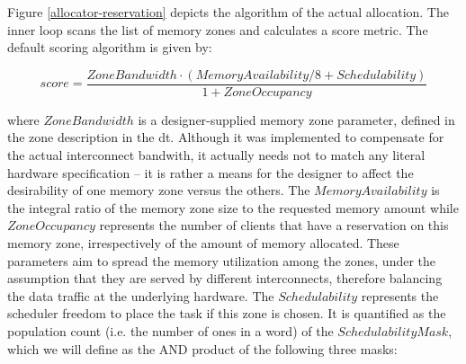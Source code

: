 Figure \ref{allocator-reservation} depicts the algorithm of the actual allocation. 
The inner loop scans the list of memory zones and calculates a score metric.
The default scoring algorithm is given by:

\[
	score = \frac{ZoneBandwidth \cdot \left(MemoryAvailability/8 + Schedulability\right)}{1 + ZoneOccupancy}
\]

where $ZoneBandwidth$ is a designer-supplied memory zone parameter, defined in the zone description in the \gls{dt}.
Although it was implemented to compensate for the actual interconnect bandwith,
it actually needs not to match any literal hardware specification -- it is rather a means for the designer to affect the
desirability of one memory zone versus the others. The $MemoryAvailability$ is the integral ratio of the memory zone size
to the requested memory amount while $ZoneOccupancy$ represents the number of clients that have a reservation on this
memory zone, irrespectively of the amount of memory allocated. These parameters aim to spread the memory utilization 
among the zones, under the assumption that they are served by different interconnects, therefore balancing the data
traffic at the underlying hardware. The $Schedulability$ represents the scheduler freedom to place the task if this zone is chosen.
It is quantified as the population count (i.e. the number of ones in a word) of the $SchedulabilityMask$, which we will define
as the AND product of the following three masks:

